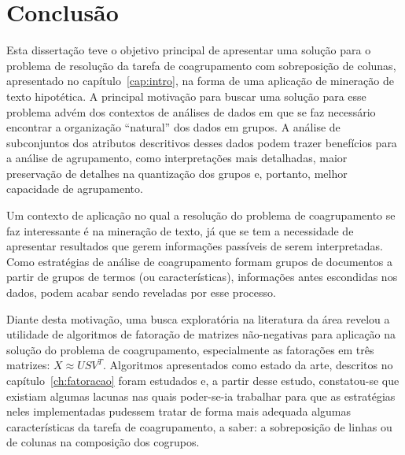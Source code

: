 \documentclass[
    12pt,                %
    oneside,            %
    a4paper,            %
    english,            %
    brazil                %
    ]{abntex2ppgsi}
\begin{document}

\chapter{Conclusão}
\label{ch:conclusoes}

Esta dissertação teve o objetivo principal de apresentar uma solução para o problema de resolução da tarefa de coagrupamento com sobreposição de colunas, apresentado no capítulo~\ref{cap:intro}, na forma de uma aplicação de mineração de texto hipotética.
A principal motivação para buscar uma solução para esse problema advém dos contextos de análises de dados em que se faz necessário encontrar a organização ``natural'' dos dados em grupos.
A análise de subconjuntos dos atributos descritivos desses dados podem trazer benefícios para a análise de agrupamento, como interpretações mais detalhadas, maior preservação de detalhes na quantização dos grupos e, portanto, melhor capacidade de agrupamento.

Um contexto de aplicação no qual a resolução do problema de coagrupamento se faz interessante é na mineração de texto, já que se tem a necessidade de apresentar resultados que gerem informações passíveis de serem interpretadas.
Como estratégias de análise de coagrupamento formam grupos de documentos a partir de grupos de termos (ou características), informações antes escondidas nos dados, podem acabar sendo reveladas por esse processo.

Diante desta motivação, uma busca exploratória na literatura da área revelou a utilidade de algoritmos de fatoração de matrizes não-negativas para aplicação na solução do problema de coagrupamento, especialmente as fatorações em três matrizes: $X \approx USV^T$.
Algoritmos apresentados como estado da arte, descritos no capítulo~\ref{ch:fatoracao} foram estudados e, a partir desse estudo, constatou-se que existiam algumas lacunas nas quais poder-se-ia trabalhar para que as estratégias neles implementadas pudessem tratar de forma mais adequada algumas características da tarefa de coagrupamento, a saber: a sobreposição de linhas ou de colunas na composição dos cogrupos.
\end{document}
